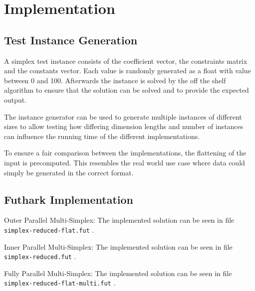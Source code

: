 \section{Implementation}
\subsection{Test Instance Generation}
A simplex test instance consists of the coefficient vector, the constraints matrix and the constants vector. Each value is randomly generated as a float with value between 0 and 100. Afterwards the instance is solved by the off the shelf algorithm to ensure that the solution can be solved and to provide the expected output. 

The instance generator can be used to generate multiple instances of different sizes to allow testing how differing dimension lengths and number of instances can influence the running time of the different implementations.

To ensure a fair comparison between the implementations, the flattening of the input is precomputed. This resembles the real world use case where data could simply be generated in the correct format. 

\subsection{Futhark Implementation}
Outer Parallel Multi-Simplex:
The implemented solution can be seen in file \texttt{simplex-reduced-flat.fut} .

\newpar
Inner Parallel Multi-Simplex:
The implemented solution can be seen in file \texttt{simplex-reduced.fut} .

\newpar
Fully Parallel Multi-Simplex:
The implemented solution can be seen in file \texttt{simplex-reduced-flat-multi.fut} .